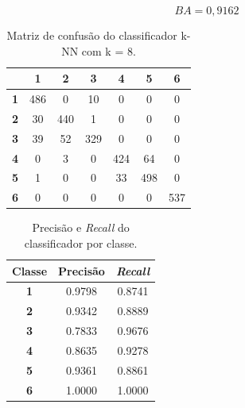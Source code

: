 \begin{equation}\label{eq:ba_lr_500}
	BA = 0,9162
\end{equation}

\begin{table}[H]
	\centering
\begin{tabular}{c||c|c|c|c|c|c|}
	\cline{2-7}
	& \textbf{1} & \textbf{2} & \textbf{3} & \textbf{4} & \textbf{5} & \textbf{6} \\ \hline \hline
	\multicolumn{1}{|c||}{\textbf{1}} & 486        & 0          & 10         & 0          & 0          & 0          \\ \hline
	\multicolumn{1}{|c||}{\textbf{2}} & 30         & 440        & 1          & 0          & 0          & 0          \\ \hline
	\multicolumn{1}{|c||}{\textbf{3}} & 39         & 52         & 329        & 0          & 0          & 0          \\ \hline
	\multicolumn{1}{|c||}{\textbf{4}} & 0          & 3          & 0          & 424        & 64         & 0          \\ \hline
	\multicolumn{1}{|c||}{\textbf{5}} & 1          & 0          & 0          & 33         & 498        & 0          \\ \hline
	\multicolumn{1}{|c||}{\textbf{6}} & 0          & 0          & 0          & 0          & 0          & 537        \\ \hline
\end{tabular}
	\caption{Matriz de confusão do classificador k-NN com k = 8.}
	\label{tab:mc_lr_500}
\end{table}

\begin{table}[H]
	\centering
	\begin{tabular}{c|c|c}
		\textbf{Classe} & \textbf{Precisão} & \textit{\textbf{Recall}} \\ \hline
		\textbf{1}      & 0.9798            & 0.8741                   \\
		\textbf{2}      & 0.9342            & 0.8889                   \\
		\textbf{3}      & 0.7833            & 0.9676                   \\
		\textbf{4}      & 0.8635            & 0.9278                   \\
		\textbf{5}      & 0.9361            & 0.8861                   \\
		\textbf{6}      & 1.0000            & 1.0000                  
	\end{tabular}
	\caption{Precisão e \textit{Recall} do classificador por classe.}
	\label{tab:pr_lr_500}
\end{table}



